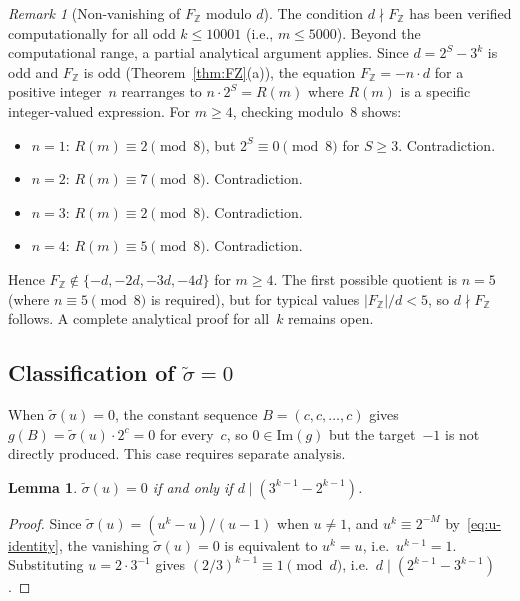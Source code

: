 \documentclass[12pt, a4paper]{amsart}
\theoremstyle{plain}
\newtheorem{lemma}[theorem]{Lemma}
\theoremstyle{definition}
\theoremstyle{remark}
\newtheorem{remark}[theorem]{Remark}
\newcommand{\Z}{\mathbb{Z}}
\begin{document}
\begin{remark}[Non-vanishing of $F_\Z$ modulo $d$]%
\label{rem:FZ-mod8}
  The condition $d \nmid F_\Z$ has been verified
  computationally for all odd $k \leq 10001$
  (i.e., $m \leq 5000$).
  Beyond the computational range, a partial analytical
  argument applies.
  Since $d = 2^S - 3^k$ is odd and $F_\Z$ is odd
  (Theorem~\ref{thm:FZ}(a)), the equation
  $F_\Z = -n \cdot d$ for a positive integer~$n$
  rearranges to $n \cdot 2^S = R(m)$ where $R(m)$
  is a specific integer-valued expression.
  For $m \geq 4$, checking modulo~$8$ shows:
  \begin{itemize}
    \item $n = 1$: $R(m) \equiv 2 \pmod{8}$, but
      $2^S \equiv 0 \pmod{8}$ for $S \geq 3$.
      Contradiction.
    \item $n = 2$: $R(m) \equiv 7 \pmod{8}$.
      Contradiction.
    \item $n = 3$: $R(m) \equiv 2 \pmod{8}$.
      Contradiction.
    \item $n = 4$: $R(m) \equiv 5 \pmod{8}$.
      Contradiction.
  \end{itemize}
  Hence $F_\Z \notin \{-d, -2d, -3d, -4d\}$ for
  $m \geq 4$.
  The first possible quotient is $n = 5$
  (where $n \equiv 5 \pmod{8}$ is required),
  but for typical values $|F_\Z|/d < 5$,
  so $d \nmid F_\Z$ follows.
  A complete analytical proof for all~$k$ remains open.
\end{remark}

\subsection{Classification of $\tilde\sigma = 0$}%
\label{ssec:sigma-zero}

When $\tilde\sigma(u) = 0$, the constant sequence
$B = (c, c, \ldots, c)$ gives
$g(B) = \tilde\sigma(u) \cdot 2^c = 0$ for every~$c$,
so $0 \in \mathrm{Im}(g)$ but the target~$-1$ is not
directly produced.
This case requires separate analysis.

\begin{lemma}\label{lem:sigma-zero-equiv}
  $\tilde\sigma(u) = 0$ if and only if
  $d \mid (3^{k-1} - 2^{k-1})$.
\end{lemma}

\begin{proof}
  Since $\tilde\sigma(u) = (u^k - u)/(u - 1)$
  when $u \neq 1$, and $u^k \equiv 2^{-M}$ by~\eqref{eq:u-identity},
  the vanishing $\tilde\sigma(u) = 0$ is equivalent to $u^k = u$,
  i.e.\ $u^{k-1} = 1$.
  Substituting $u = 2 \cdot 3^{-1}$ gives
  $(2/3)^{k-1} \equiv 1 \pmod{d}$,
  i.e.\ $d \mid (2^{k-1} - 3^{k-1})$.
\end{proof}
\end{document}
